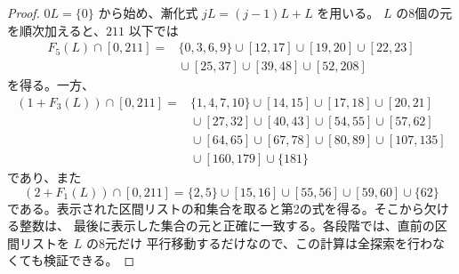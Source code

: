 \documentclass[12pt]{ltjsarticle}
\theoremstyle{plain}
\begin{document}
\begin{proof}
$0L=\{0\}$ から始め、漸化式 $jL=(j-1)L+L$ を用いる。
$L$ の8個の元を順次加えると、$211$ 以下では
\[
\begin{aligned}
F_5(L)\cap[0,211]={}&\{0,3,6,9\}\cup[12,17]\cup[19,20]\cup[22,23]\\
 &{}\cup[25,37]\cup[39,48]\cup[52,208]
\end{aligned}
\]
を得る。一方、
\[
\begin{aligned}
(1+F_3(L))\cap[0,211]
={}&\{1,4,7,10\}\cup[14,15]\cup[17,18]\cup[20,21]\\
 &{}\cup[27,32]\cup[40,43]\cup[54,55]\cup[57,62]\\
 &{}\cup[64,65]\cup[67,78]\cup[80,89]\cup[107,135]\\
 &{}\cup[160,179]\cup\{181\}
\end{aligned}
\]
であり、また
\[
 (2+F_1(L))\cap[0,211]
 =\{2,5\}\cup[15,16]\cup[55,56]\cup[59,60]\cup\{62\}
\]
である。表示された区間リストの和集合を取ると第2の式を得る。そこから欠ける整数は、
最後に表示した集合の元と正確に一致する。各段階では、直前の区間リストを $L$ の8元だけ
平行移動するだけなので、この計算は全探索を行わなくても検証できる。
\end{proof}
\end{document}
